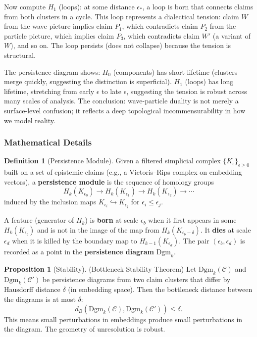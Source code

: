 \documentclass[11pt,letterpaper]{article}
\theoremstyle{definition}
\newtheorem{definition}{Definition}[section]
\newtheorem{proposition}{Proposition}[section]
\theoremstyle{remark}
\begin{document}
Now compute $H_1$ (loops): at some distance $\epsilon_*$, a loop is born that connects claims from both clusters in a cycle. This loop represents a dialectical tension: claim $W$ from the wave picture implies claim $P_1$, which contradicts claim $P_2$ from the particle picture, which implies claim $P_3$, which contradicts claim $W'$ (a variant of $W$), and so on. The loop persists (does not collapse) because the tension is structural.

The persistence diagram shows: $H_0$ (components) has short lifetime (clusters merge quickly, suggesting the distinction is superficial). $H_1$ (loops) has long lifetime, stretching from early $\epsilon$ to late $\epsilon$, suggesting the tension is robust across many scales of analysis. The conclusion: wave-particle duality is not merely a surface-level confusion; it reflects a deep topological incommensurability in how we model reality.

\subsubsection*{Mathematical Details}

\begin{definition}[Persistence Module]
Given a filtered simplicial complex $\{K_\epsilon\}_{\epsilon \geq 0}$ built on a set of epistemic claims (e.g., a Vietoris--Rips complex on embedding vectors), a \textbf{persistence module} is the sequence of homology groups
\[
H_k(K_{\epsilon_0}) \to H_k(K_{\epsilon_1}) \to H_k(K_{\epsilon_2}) \to \cdots
\]
induced by the inclusion maps $K_{\epsilon_i} \hookrightarrow K_{\epsilon_j}$ for $\epsilon_i \leq \epsilon_j$.
\end{definition}

A feature (generator of $H_k$) is \textbf{born} at scale $\epsilon_b$ when it first appears in some $H_k(K_{\epsilon_b})$ and is not in the image of the map from $H_k(K_{\epsilon_b - \delta})$. It \textbf{dies} at scale $\epsilon_d$ when it is killed by the boundary map to $H_{k-1}(K_{\epsilon_d})$. The pair $(\epsilon_b, \epsilon_d)$ is recorded as a point in the \textbf{persistence diagram} $\mathrm{Dgm}_k$.

\begin{proposition}[Stability]
(Bottleneck Stability Theorem) Let $\mathrm{Dgm}_k(\mathcal{C})$ and $\mathrm{Dgm}_k(\mathcal{C}')$ be persistence diagrams from two claim clusters that differ by Hausdorff distance $\delta$ (in embedding space). Then the bottleneck distance between the diagrams is at most $\delta$:
\[
d_B(\mathrm{Dgm}_k(\mathcal{C}), \mathrm{Dgm}_k(\mathcal{C}')) \leq \delta.
\]
This means small perturbations in embeddings produce small perturbations in the diagram. The geometry of unresolution is robust.
\end{proposition}
\end{document}
